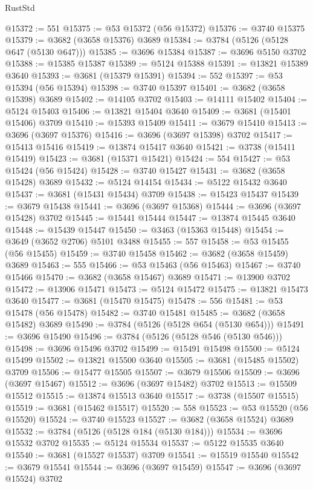 \begin{lexlean}{RustStd}
\begin{coremodule}
@15372 := 551
@15375 := @53 @15372 (@56 @15372)
@15376 := @3740 @15375
@15379 := @3682 (@3658 @15376) @3689
@15384 := @3784 (@5126 (@5128 @647 (@5130 @647)))
@15385 := @3696 @15384
@15387 := @3696 @5150 @3702
@15388 := @15385 @15387
@15389 := @5124 @15388
@15391 := @13821 @15389 @3640
@15393 := @3681 (@15379 @15391)
@15394 := 552
@15397 := @53 @15394 (@56 @15394)
@15398 := @3740 @15397
@15401 := @3682 (@3658 @15398) @3689
@15402 := @14105 @3702
@15403 := @14111 @15402
@15404 := @5124 @15403
@15406 := @13821 @15404 @3640
@15409 := @3681 (@15401 @15406) @3709
@15410 := @15393 @15409
@15411 := @3679 @15410
@15413 := @3696 (@3697 @15376)
@15416 := @3696 (@3697 @15398) @3702
@15417 := @15413 @15416
@15419 := @13874 @15417 @3640
@15421 := @3738 (@15411 @15419)
@15423 := @3681 (@15371 @15421)
@15424 := 554
@15427 := @53 @15424 (@56 @15424)
@15428 := @3740 @15427
@15431 := @3682 (@3658 @15428) @3689
@15432 := @5124 @14154
@15434 := @5122 @15432 @3640
@15437 := @3681 (@15431 @15434) @3709
@15438 := @15423 @15437
@15439 := @3679 @15438
@15441 := @3696 (@3697 @15368)
@15444 := @3696 (@3697 @15428) @3702
@15445 := @15441 @15444
@15447 := @13874 @15445 @3640
@15448 := @15439 @15447
@15450 := @3463 (@15363 @15448)
@15454 := @3649 (@3652 @2706) @5101 @3488
@15455 := 557
@15458 := @53 @15455 (@56 @15455)
@15459 := @3740 @15458
@15462 := @3682 (@3658 @15459) @3689
@15463 := 555
@15466 := @53 @15463 (@56 @15463)
@15467 := @3740 @15466
@15470 := @3682 (@3658 @15467) @3689
@15471 := @13900 @3702
@15472 := @13906 @15471
@15473 := @5124 @15472
@15475 := @13821 @15473 @3640
@15477 := @3681 (@15470 @15475)
@15478 := 556
@15481 := @53 @15478 (@56 @15478)
@15482 := @3740 @15481
@15485 := @3682 (@3658 @15482) @3689
@15490 := @3784 (@5126 (@5128 @654 (@5130 @654)))
@15491 := @3696 @15490
@15496 := @3784 (@5126 (@5128 @546 (@5130 @546)))
@15498 := @3696 @15496 @3702
@15499 := @15491 @15498
@15500 := @5124 @15499
@15502 := @13821 @15500 @3640
@15505 := @3681 (@15485 @15502) @3709
@15506 := @15477 @15505
@15507 := @3679 @15506
@15509 := @3696 (@3697 @15467)
@15512 := @3696 (@3697 @15482) @3702
@15513 := @15509 @15512
@15515 := @13874 @15513 @3640
@15517 := @3738 (@15507 @15515)
@15519 := @3681 (@15462 @15517)
@15520 := 558
@15523 := @53 @15520 (@56 @15520)
@15524 := @3740 @15523
@15527 := @3682 (@3658 @15524) @3689
@15532 := @3784 (@5126 (@5128 @184 (@5130 @184)))
@15534 := @3696 @15532 @3702
@15535 := @5124 @15534
@15537 := @5122 @15535 @3640
@15540 := @3681 (@15527 @15537) @3709
@15541 := @15519 @15540
@15542 := @3679 @15541
@15544 := @3696 (@3697 @15459)
@15547 := @3696 (@3697 @15524) @3702

\end{coremodule}
\end{lexlean}

